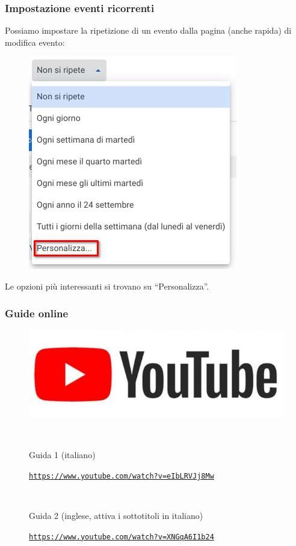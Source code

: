 \documentclass[handout]{beamer}
\begin{document}
\begin{frame}
\frametitle{Impostazione eventi ricorrenti}
Possiamo impostare la ripetizione di un evento dalla pagina (anche rapida) di modifica evento:
\begin{figure}
  \includegraphics[width=.4\columnwidth]{img/calendarricorrente.png}
\end{figure}
Le opzioni più interessanti si trovano su ``Personalizza''.
\end{frame}




\begin{frame}
\frametitle{Guide online}
\begin{figure}
\includegraphics[width=.5\columnwidth]{img/ytlogo.jpg}

~

Guida 1 (italiano)

\href{https://www.youtube.com/watch?v=eIbLRVJj8Mw}{\texttt{https://www.youtube.com/watch?v=eIbLRVJj8Mw}}

~

Guida 2 (inglese, attiva i sottotitoli in italiano)

\href{https://www.youtube.com/watch?v=XNGqA6I1b24}{\texttt{https://www.youtube.com/watch?v=XNGqA6I1b24}}
\end{figure}
\end{frame}
\end{document}

